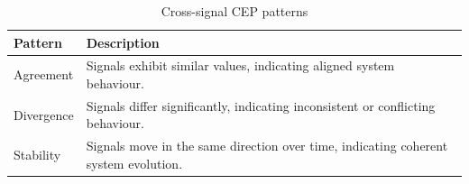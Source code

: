 \begin{table}[htp]
\centering
\caption{Cross-signal CEP patterns}
\label{tab:patterns}
\begin{tabular}{l p{9cm}}
\toprule
Pattern & Description \\
\midrule
Agreement & Signals exhibit similar values, indicating aligned system behaviour. \\
Divergence & Signals differ significantly, indicating inconsistent or conflicting behaviour. \\
Stability & Signals move in the same direction over time, indicating coherent system evolution. \\
\bottomrule
\end{tabular}
\end{table}